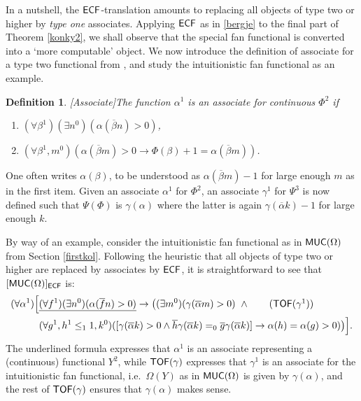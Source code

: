 \documentclass[reqno]{amsart}
\newtheorem{defi}[thm]{Definition}
\def\bdefi{\begin{defi}\rm}
\def\edefi{\end{defi}}
\def\RCA{\textup{\textsf{RCA}}}
\def\MUC{\textup{\textsf{MUC}}}
\def\di{\rightarrow}
\def\TOF{\textup{\textsf{TOF}}}
\def\ECF{\textup{\textsf{ECF}}}
\numberwithin{equation}{section}
\numberwithin{thm}{section}
\begin{document}
\medskip

In a nutshell, the $\ECF$-translation amounts to replacing all objects of type two or higher by \emph{type one} associates.  
Applying $\ECF$ as in \eqref{bergje} to the final part of Theorem  \ref{konky2}, we shall observe that the special fan functional is converted into a `more computable' object.  We now introduce the definition of associate for a type two functional from \cite{kohlenbach4}, and study the intuitionistic fan functional as an example.  
\bdefi[Associate]\label{LAX} The function $\alpha^{1}$ is an \emph{associate} for continuous $\Phi^{2}$ if
\begin{enumerate}
\item $(\forall \beta^{1})(\exists n^{0})(\alpha(\overline{\beta}n)>0)$,
\item $(\forall \beta^{1}, m^{0})(\alpha(\overline{\beta}m)>0 \di \Phi(\beta)+1=\alpha(\overline{\beta}m))$.
\end{enumerate}
\edefi
One often writes $\alpha(\beta)$, to be understood as $\alpha(\overline{\beta}m)-1$ for large enough $m$ as in the first item.  
Given an associate $\alpha^{1}$ for $\Phi^{2}$, an associate $\gamma^{1}$ for $\Psi^{3}$ is now defined such that $\Psi(\Phi)$ is $\gamma(\alpha)$ where the latter is again $\gamma(\overline{\alpha}k)-1$ for large enough $k$.  

\medskip

By way of an example, consider the intuitionistic fan functional as in $\MUC(\Omega)$ from Section \ref{firstkol}. 
Following the heuristic that all objects of type two or higher are replaced by associates by $\ECF$, it is straightforward to see that $[\MUC(\Omega)]_{\ECF}$ is:
\begin{align}
(\forall \alpha^{1})\Big[ &\underline{(\forall f^{1})(\exists n^{0})(\alpha(\overline{f}n)>0)}\di\big( (\exists m^{0})(\gamma(\overline{\alpha}m)>0)  ~ \wedge \tag{$\TOF(\gamma^{1})$}     \\
& (\forall g^{1}, h^{1}\leq_{1}1, k^{0})([\gamma(\overline{\alpha}k)>0\wedge \overline{h}\gamma(\overline{\alpha}k)=_{0} \overline{g}\gamma(\overline{\alpha}k)]  \di \alpha(h)=\alpha(g) >0 ) \big)\Big].\notag
\end{align}
The underlined formula expresses that $\alpha^{1}$ is an associate representing a (continuous) functional $Y^{2}$, while $\TOF(\gamma)$ expresses that $\gamma^{1}$ is an associate for the intuitionistic fan functional, i.e.\ $\Omega(Y)$ as in $\MUC(\Omega)$ is given by $\gamma(\alpha)$, and the rest of $\TOF(\gamma)$ ensures that $\gamma(\alpha)$ makes sense.  
\end{document}
